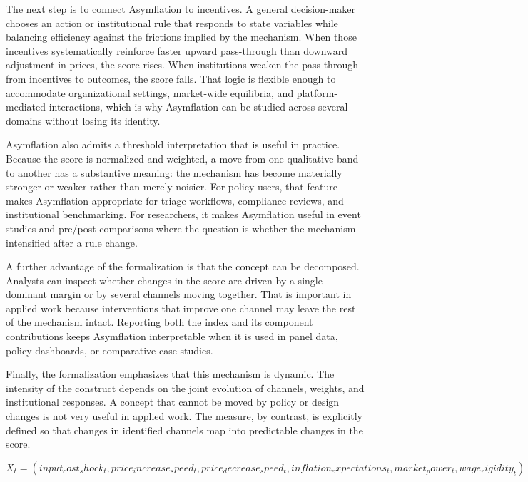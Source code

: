 \documentclass[12pt]{article}
\begin{document}
The next step is to connect Asymflation to incentives. A general decision-maker chooses an action or institutional rule that responds to state variables while balancing efficiency against the frictions implied by the mechanism. When those incentives systematically reinforce faster upward pass-through than downward adjustment in prices, the score rises. When institutions weaken the pass-through from incentives to outcomes, the score falls. That logic is flexible enough to accommodate organizational settings, market-wide equilibria, and platform-mediated interactions, which is why Asymflation can be studied across several domains without losing its identity.

Asymflation also admits a threshold interpretation that is useful in practice. Because the score is normalized and weighted, a move from one qualitative band to another has a substantive meaning: the mechanism has become materially stronger or weaker rather than merely noisier. For policy users, that feature makes Asymflation appropriate for triage workflows, compliance reviews, and institutional benchmarking. For researchers, it makes Asymflation useful in event studies and pre/post comparisons where the question is whether the mechanism intensified after a rule change.

A further advantage of the formalization is that the concept can be decomposed. Analysts can inspect whether changes in the score are driven by a single dominant margin or by several channels moving together. That is important in applied work because interventions that improve one channel may leave the rest of the mechanism intact. Reporting both the index and its component contributions keeps Asymflation interpretable when it is used in panel data, policy dashboards, or comparative case studies.

Finally, the formalization emphasizes that this mechanism is dynamic. The intensity of the construct depends on the joint evolution of channels, weights, and institutional responses. A concept that cannot be moved by policy or design changes is not very useful in applied work. The measure, by contrast, is explicitly defined so that changes in identified channels map into predictable changes in the score.

\begin{equation}
X_t = (input_cost_shock_t, price_increase_speed_t, price_decrease_speed_t, inflation_expectations_t, market_power_t, wage_rigidity_t)
\label{eq:channels}
\end{equation}
\end{document}
